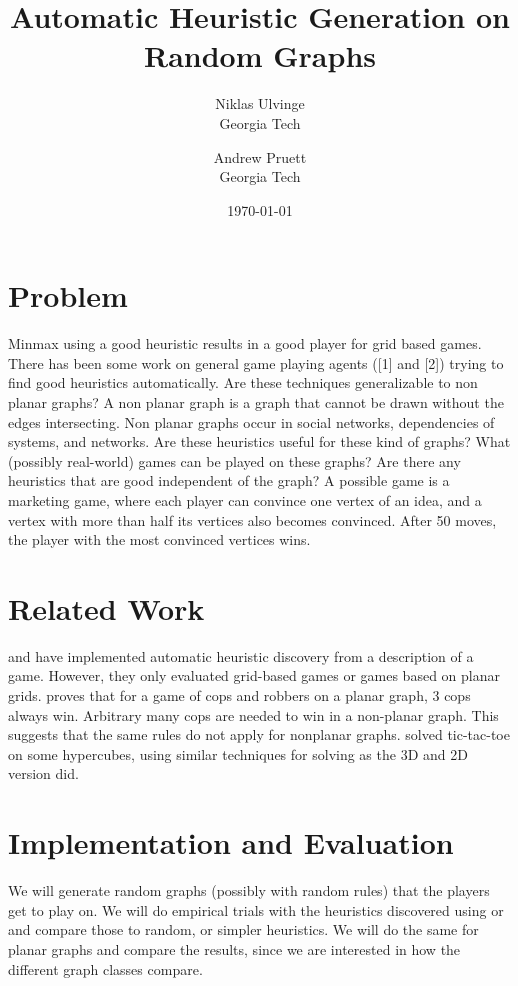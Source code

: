 \documentclass{article}
\title{Automatic Heuristic Generation on Random Graphs}
\author{Niklas Ulvinge  \\
	Georgia Tech  \\
	\and 
	Andrew Pruett \\
	Georgia Tech \\
	}
\date{\today}
\begin{document}


\maketitle

\section{Problem}
Minmax using a good heuristic results in a good player for grid based games. There has been some work on general game playing agents ([1] and [2]) trying to find good heuristics automatically. Are these techniques generalizable to non planar graphs?
A non planar graph is a graph that cannot be drawn without the edges intersecting. Non planar graphs occur in social networks, dependencies of systems, and networks. Are these heuristics useful for these kind of graphs? What (possibly real-world) games can be played on these graphs? Are there any heuristics that are good independent of the graph?
A possible game is a marketing game, where each player can convince one vertex of an idea, and a vertex with more than half its vertices also becomes convinced. After 50 moves, the player with the most convinced vertices wins.
\section{Related Work}
\cite{Clune2007} and \cite{Kuhlmann2006}  have implemented automatic heuristic discovery from a description of a game. However, they only evaluated grid-based games or games based on planar grids. \cite{Aigner1984} proves that for a game of cops and robbers on a planar graph, 3 cops always win. Arbitrary many cops are needed to win in a non-planar graph. This suggests that the same rules do not apply for nonplanar graphs. \cite{Berlekamp2001} solved tic-tac-toe on some hypercubes, using similar techniques for solving as the 3D and 2D version did.

\section{Implementation and Evaluation} 
We will generate random graphs (possibly with random rules) that the players get to play on. We will do empirical trials with the heuristics discovered using \cite{Clune2007} or \cite{Kuhlmann2006} and compare those to random, or simpler heuristics. We will do the same for planar graphs and compare the results, since we are interested in how the different graph classes compare.


\end{document}
